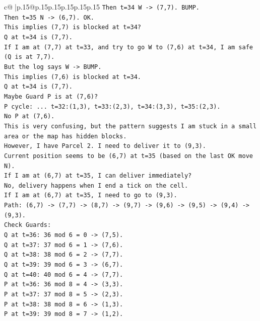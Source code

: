 \documentclass{article}
\begin{document}
{\begin{supertabular}{c@{$\;$}|p{.15\linewidth}@{}p{.15\linewidth}p{.15\linewidth}p{.15\linewidth}p{.15\linewidth}p{.15\linewidth}}
{{{\texttt{Then t=34 W {-}> (7,7). BUMP.} \\
\texttt{Then t=35 N {-}> (6,7). OK.} \\
\texttt{This implies (7,7) is blocked at t=34?} \\
\texttt{Q at t=34 is (7,7).} \\
\texttt{If I am at (7,7) at t=33, and try to go W to (7,6) at t=34, I am safe (Q is at 7,7).} \\
\texttt{But the log says W {-}> BUMP.} \\
\texttt{This implies (7,6) is blocked at t=34.} \\
\texttt{Q at t=34 is (7,7).} \\
\texttt{Maybe Guard P is at (7,6)?} \\
\texttt{P cycle: ... t=32:(1,3), t=33:(2,3), t=34:(3,3), t=35:(2,3).} \\
\texttt{No P at (7,6).} \\
\texttt{This is very confusing, but the pattern suggests I am stuck in a small area or the map has hidden blocks.} \\
\texttt{However, I have Parcel 2. I need to deliver it to (9,3).} \\
\texttt{Current position seems to be (6,7) at t=35 (based on the last OK move N).} \\
\texttt{If I am at (6,7) at t=35, I can deliver immediately?} \\
\texttt{No, delivery happens when I end a tick on the cell.} \\
\texttt{If I am at (6,7) at t=35, I need to go to (9,3).} \\
\texttt{Path: (6,7) {-}> (7,7) {-}> (8,7) {-}> (9,7) {-}> (9,6) {-}> (9,5) {-}> (9,4) {-}> (9,3).} \\
\texttt{Check Guards:} \\
\texttt{Q at t=36: 36 mod 6 = 0 {-}> (7,5).} \\
\texttt{Q at t=37: 37 mod 6 = 1 {-}> (7,6).} \\
\texttt{Q at t=38: 38 mod 6 = 2 {-}> (7,7).} \\
\texttt{Q at t=39: 39 mod 6 = 3 {-}> (6,7).} \\
\texttt{Q at t=40: 40 mod 6 = 4 {-}> (7,7).} \\
\texttt{P at t=36: 36 mod 8 = 4 {-}> (3,3).} \\
\texttt{P at t=37: 37 mod 8 = 5 {-}> (2,3).} \\
\texttt{P at t=38: 38 mod 8 = 6 {-}> (1,3).} \\
\texttt{P at t=39: 39 mod 8 = 7 {-}> (1,2).} \\
}}}
\end{supertabular}}
\end{document}
